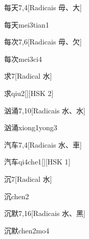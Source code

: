 \begin{entry}{每天}{7,4}[Radicais ⽏、⼤]
  \begin{phonetics}{每天}{mei3tian1}
  \end{phonetics}
\end{entry}

\begin{entry}{每次}{7,6}[Radicais ⽏、⽋]
  \begin{phonetics}{每次}{mei3ci4}
  \end{phonetics}
\end{entry}

\begin{entry}{求}{7}[Radical ⽔]
  \begin{phonetics}{求}{qiu2}[][HSK 2]
  \end{phonetics}
\end{entry}

\begin{entry}{汹涌}{7,10}[Radicais ⽔、⽔]
  \begin{phonetics}{汹涌}{xiong1yong3}
  \end{phonetics}
\end{entry}

\begin{entry}{汽车}{7,4}[Radicais ⽔、⾞]
  \begin{phonetics}{汽车}{qi4che1}[][HSK 1]
  \end{phonetics}
\end{entry}

\begin{entry}{沉}{7}[Radical ⽔]
  \begin{phonetics}{沉}{chen2}
  \end{phonetics}
\end{entry}

\begin{entry}{沉默}{7,16}[Radicais ⽔、⿊]
  \begin{phonetics}{沉默}{chen2mo4}
  \end{phonetics}
\end{entry}

